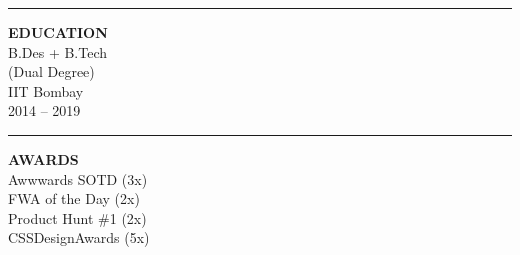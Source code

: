 \documentclass[10pt,letterpaper]{article}
\begin{document}
\begin{minipage}[t][0.96\textheight][t]{5.8cm}
\begin{minipage}{5cm}
\vspace{14pt}
{\color{coral}\rule{4.5cm}{0.5pt}}

\vspace{10pt}
{\color{coral}\bfseries\small EDUCATION}\\[6pt]
{\small B.Des + B.Tech\\(Dual Degree)\\IIT Bombay\\2014 -- 2019}

\vspace{14pt}
{\color{coral}\rule{4.5cm}{0.5pt}}

\vspace{10pt}
{\color{coral}\bfseries\small AWARDS}\\[6pt]
{\small\color{sidetext}
 Awwwards SOTD (3x)\\[3pt]
 FWA of the Day (2x)\\[3pt]
 Product Hunt \#1 (2x)\\[3pt]
 CSSDesignAwards (5x)}

\end{minipage}
\end{minipage}%
%
\end{document}
